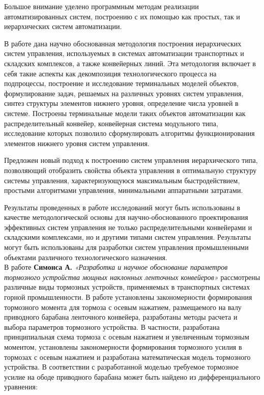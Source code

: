 Большое внимание уделено программным методам реализации автоматизированных систем, построению с их помощью как простых, так и иерархических систем автоматизации.

В работе дана научно обоснованная методология построения иерархических систем управления, используемых в системах автоматизации транспортных и складских комплексов, а также конвейерных линий. Эта методология включает в себя такие аспекты как декомпозиция технологического процесса на подпроцессы, построение и исследование терминальных моделей объектов, формулирование задач, решаемых на различных уровнях систем управления, синтез структуры элементов нижнего уровня, определение числа уровней в системе. Построены терминальные модели таких объектов автоматизации как распределительный конвейер, конвейерная система модульного типа, исследование которых позволило сформулировать алгоритмы функционирования элементов нижнего уровня систем управления. 

Предложен новый подход к построению систем управления иерархического типа, позволяющий отобразить свойства объекта управления в оптимальную структуру системы управления, характеризующуюся максимальным быстродействием, простыми алгоритмами управления, минимальными аппаратными затратами. 

Результаты проведенных в работе исследований могут быть использованы в качестве методологической основы для научно-обоснованного проектирования эффективных систем управления не только распределительными конвейерами и складскими комплексами, но и другими типами систем управления. Результаты могут быть использованы для разработки систем управления промышленными объектами различного технологического назначения.\\

В работе \textbf{ Симонса А. } \textit{«Разработка и научное обоснование параметров тормозного устройства мощных наклонных ленточных конвейеров»} \cite{asimons} рассмотрены различные виды тормозных устройств, применяемых в транспортных системах горной промышленности. В работе установлены закономерности формирования тормозного момента для тормоза с осевым нажатием, размещаемого на валу приводного барабана ленточного конвейера, разработаны методы расчета и выбора параметров тормозного устройства. В частности, разработана принципиальная схема тормоза с осевым нажатием и увеличенным тормозным моментом, установлены закономерности формирования тормозного усилия  в тормозах с осевым нажатием и разработана математическая модель тормозного устройства. В соответствии с разработанной моделью требуемое тормозное усилие на ободе приводного барабана может быть найдено из дифференциального уравнения:

